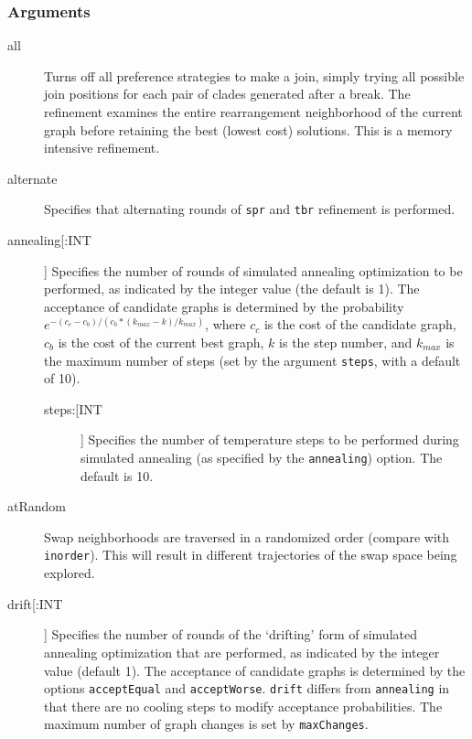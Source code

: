 	\subsubsection{Arguments}
	\begin{description}
		\item[all] Turns off all preference strategies to make a join, simply trying all possible 
		join positions for each pair of clades generated after a break. 
		The refinement examines the entire rearrangement neighborhood of the current graph 
		before retaining the best (lowest cost) solutions. This is a memory intensive refinement.

		\item[alternate] Specifies that alternating rounds of \texttt{spr} \citep{Dayhoff1969} 
		and \texttt{tbr} \citep{Farris1988, swofford1990a} refinement is performed.
		
		\item[annealing[:INT]] Specifies the number of rounds of simulated annealing 
		\citep{Metropolisetal1953,Kirkpatricketal1983,Cerny1985} optimization to be performed, 
		as indicated by the integer value (the default is 1). The acceptance of candidate graphs 
		is determined by the probability $e ^ {- (c_c - c_b)/ (c_b * (k_{max} -k)/ k_{max})}$, 
		where $c_c$ is the cost of the candidate graph, $c_b$ is the cost of the current best 
		graph, $k$ is the step number, and $k_{max}$ is the maximum number of steps (set 
		by the argument \texttt{steps}, with a default of 10).
		
			\begin{description}
			\item[steps:[INT]] Specifies the number of temperature steps to be performed during 
			simulated annealing (as specified by the \texttt{annealing}) option. The default is 10.
			\end{description}
		
		\item[atRandom] Swap neighborhoods are traversed in a randomized order (compare 
		with \texttt{inorder}). 	This will result in different trajectories of the swap space being 
		explored.
		
		\item[drift[:INT]] Specifies the number of rounds of the `drifting' form of simulated 
		annealing \citep{goloboff1999} optimization that are performed, as indicated by the integer 
		value (default 1). The acceptance of candidate graphs is determined by the options 
		\texttt{acceptEqual} and \texttt{acceptWorse}. \texttt{drift} differs from \texttt{annealing} 
		in that there are no cooling steps to modify acceptance probabilities. The maximum 
		number of graph changes is set by \texttt{maxChanges}.
			

\end{description}
